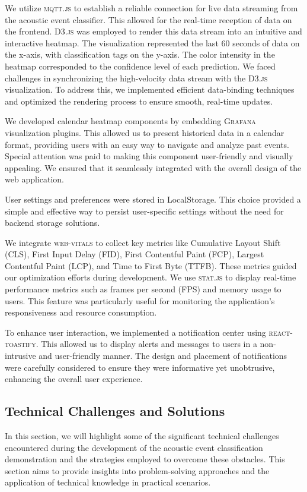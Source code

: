 We utilize \textsc{mqtt.js} to establish a reliable connection for live data streaming from the acoustic event classifier. This allowed for the real-time reception of data on the frontend. \textsc{D3.js} was employed to render this data stream into an intuitive and interactive heatmap. The visualization represented the last 60 seconds of data on the x-axis, with classification tags on the y-axis. The color intensity in the heatmap corresponded to the confidence level of each prediction. We faced challenges in synchronizing the high-velocity data stream with the \textsc{D3.js} visualization. To address this, we implemented efficient data-binding techniques and optimized the rendering process to ensure smooth, real-time updates.

We developed calendar heatmap components by embedding \textsc{Grafana} visualization plugins. This allowed us to present historical data in a calendar format, providing users with an easy way to navigate and analyze past events. Special attention was paid to making this component user-friendly and visually appealing. We ensured that it seamlessly integrated with the overall design of the web application.

User settings and preferences were stored in LocalStorage. This choice provided a simple and effective way to persist user-specific settings without the need for backend storage solutions.

We integrate \textsc{web-vitals} to collect key metrics like Cumulative Layout Shift (CLS), First Input Delay (FID), First Contentful Paint (FCP), Largest Contentful Paint (LCP), and Time to First Byte (TTFB). These metrics guided our optimization efforts during development. We use \textsc{stat.js} to display real-time performance metrics such as frames per second (FPS) and memory usage to users. This feature was particularly useful for monitoring the application's responsiveness and resource consumption.

To enhance user interaction, we implemented a notification center using \textsc{react-toastify}. This allowed us to display alerts and messages to users in a non-intrusive and user-friendly manner. The design and placement of notifications were carefully considered to ensure they were informative yet unobtrusive, enhancing the overall user experience.

\subsection{Technical Challenges and Solutions}
In this section, we will highlight some of the significant technical challenges encountered during the development of the acoustic event classification demonstration and the strategies employed to overcome these obstacles. This section aims to provide insights into problem-solving approaches and the application of technical knowledge in practical scenarios.


